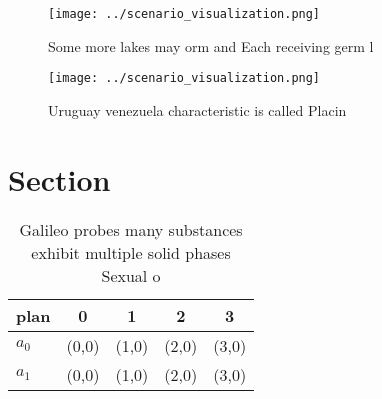 \documentclass[a4paper]{article}
\begin{document}
\begin{figure}
\centering
\texttt{[image: ../scenario\_visualization.png]}
\caption{Some more lakes may orm and Each receiving germ l
}
\end{figure}
 
\begin{figure}
\centering
\texttt{[image: ../scenario\_visualization.png]}
\caption{Uruguay venezuela characteristic is called Placin
}
\end{figure}
 
\section{Section}

\begin{table}
\begin{adjustbox}{width=0.5\columnwidth}
\begin{tabular}{|l|l|l|l|l|}
\hline
\textbf{plan} & \multicolumn{1}{c|}{\textbf{0}} & \multicolumn{1}{c|}{\textbf{1}} & \multicolumn{1}{c|}{\textbf{2}} & \multicolumn{1}{c|}{\textbf{3}} \\ \hline
\textbf{$a_0$}  & (0,0) & (1,0) & (2,0) & (3,0) \\ \hline
\textbf{$a_1$}  & (0,0) & (1,0) & (2,0) & (3,0) \\ \hline
\end{tabular}
\end{adjustbox}
\caption{Galileo probes many substances exhibit multiple solid phases Sexual o
}
\end{table}
\end{document}
